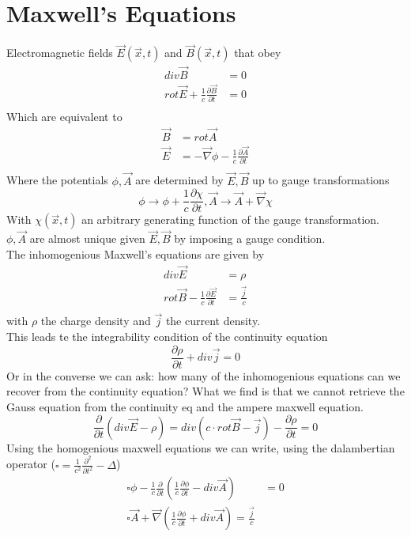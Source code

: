 \documentclass{report}
\begin{document}
\section{Maxwell's Equations}
Electromagnetic fields $\vec{E}\left( \vec{x}, t \right) $ and $\vec{B}\left( \vec{x}, t \right) $ that obey
\begin{align*}
  div \vec{B} &= 0 \\
  rot \vec{E} + \frac{1}{c} \frac{\partial \vec{B} }{\partial t} &= 0 \\
\end{align*}
Which are equivalent to 
\begin{align*}
  \vec{B} &= rot \vec{A} \\
  \vec{E} &=  - \vec{\nabla} \phi - \frac{1}{c} \frac{\partial \vec{A}}{\partial t} \\
\end{align*}
Where the potentials $\phi, \vec{A}$ are determined by $\vec{E}, \vec{B}$ up to gauge transformations \[
\phi \to \phi + \frac{1}{c} \frac{\partial \chi}{\partial t}, \vec{A} \to \vec{A} + \vec{\nabla } \chi
\] With $\chi\left( \vec{x}, t \right) $ an arbitrary generating function of the gauge transformation.\\
$\phi, \vec{A}$ are almost unique given $\vec{E}, \vec{B}$ by imposing a gauge condition.\\
The inhomogenious Maxwell's equations are given by 
\begin{align*}
  div \vec{E} &=  \rho \\
  rot \vec{B} - \frac{1}{c} \frac{\partial \vec{E}}{\partial t} &=  \frac{\vec{j}}{c}  \\
\end{align*}
with $\rho$ the charge density and $\vec{j}$ the current density.\\
This leads te the integrability condition of the continuity equation
\[
\frac{\partial \rho}{\partial t} + div \vec{j} = 0
\] 
Or in the converse we can ask: how many of the inhomogenious equations can we recover from the continuity equation? What we find is that we cannot retrieve the Gauss equation from the continuity eq and the ampere maxwell equation. \[
  \frac{\partial }{\partial t}\left( div \vec{E} - \rho \right) = div \left( c \cdot rot \vec{B} - \vec{j} \right) - \frac{\partial \rho}{\partial t} = 0 
\] 
Using the homogenious maxwell equations we can write, using the dalambertian operator ($\square = \frac{1}{c^2} \frac{\partial^2 }{\partial t^2} - \Delta $)
\begin{align*}
  \square \phi - \frac{1}{c} \frac{\partial }{\partial t} \left( \frac{1}{c} \frac{\partial \phi}{\partial t} - div \vec{A} \right)  &=  0 \\
  \square \vec{A} + \vec{\nabla } \left( \frac{1}{c} \frac{\partial \phi}{\partial t} + div \vec{A} \right) = \frac{\vec{j}}{c}
\end{align*}
\end{document}
